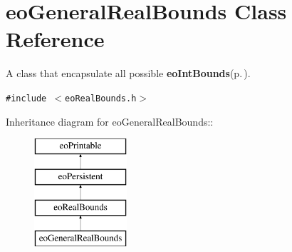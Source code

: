 \section{eo\-General\-Real\-Bounds Class Reference}
\label{classeo_general_real_bounds}
A class that encapsulate all possible {\bf eo\-Int\-Bounds}{\rm (p.\,\pageref{classeo_int_bounds})}.  


{\tt \#include $<$eo\-Real\-Bounds.h$>$}

Inheritance diagram for eo\-General\-Real\-Bounds::\begin{figure}[H]
\begin{center}
\leavevmode
\includegraphics[height=4cm]{classeo_general_real_bounds}
\end{center}
\end{figure}
